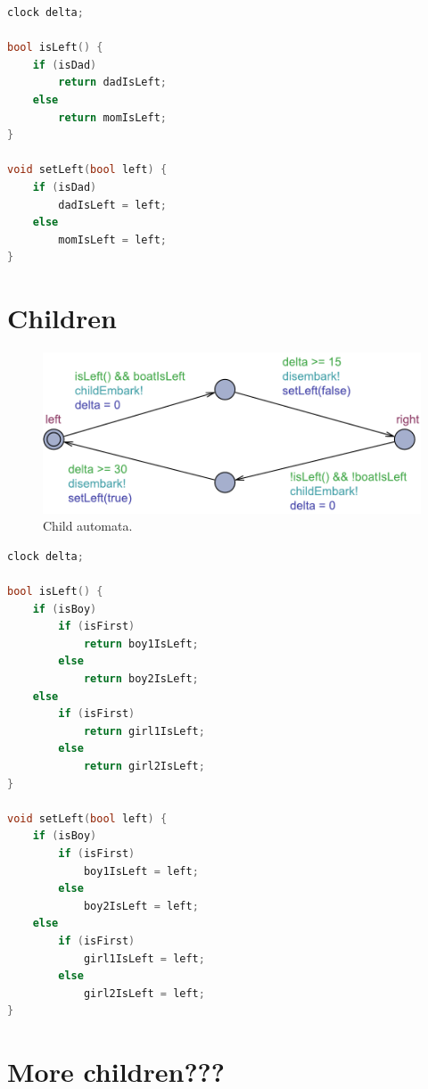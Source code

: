 \documentclass[a4paper,12pt]{scrartcl}
\begin{document}
\begin{lstlisting}[language=CPP, label = lst:plugin_example, caption = Parent declaration.]
clock delta;

bool isLeft() {
    if (isDad)
        return dadIsLeft;
    else
        return momIsLeft;
}

void setLeft(bool left) {
    if (isDad)
        dadIsLeft = left;
    else
        momIsLeft = left;
}
\end{lstlisting}



\section*{Children}

\begin{figure}[h!]
\centering
\includegraphics[width=0.7\linewidth]{Child.pdf}
\caption{Child automata.}
\label{fig:child}
\end{figure}

\begin{lstlisting}[language=CPP, label = lst:plugin_example, caption = Child declaration.]
clock delta;

bool isLeft() {
    if (isBoy)
        if (isFirst)
            return boy1IsLeft;
        else
            return boy2IsLeft;
    else
        if (isFirst)
            return girl1IsLeft;
        else
            return girl2IsLeft;
}

void setLeft(bool left) {
    if (isBoy)
        if (isFirst)
            boy1IsLeft = left;
        else
            boy2IsLeft = left;
    else
        if (isFirst)
            girl1IsLeft = left;
        else
            girl2IsLeft = left;
}
\end{lstlisting}


\section*{More children???}
\end{document}
